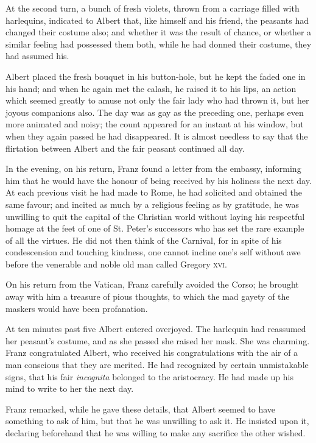  At the second turn, a bunch of fresh violets, thrown from a carriage filled with harlequins, indicated to Albert that, like himself and his friend, the peasants had changed their costume also; and whether it was the result of chance, or whether a similar feeling had possessed them both, while he had donned their costume, they had assumed his. 

 Albert placed the fresh bouquet in his button-hole, but he kept the faded one in his hand; and when he again met the calash, he raised it to his lips, an action which seemed greatly to amuse not only the fair lady who had thrown it, but her joyous companions also. The day was as gay as the preceding one, perhaps even more animated and noisy; the count appeared for an instant at his window, but when they again passed he had disappeared. It is almost needless to say that the flirtation between Albert and the fair peasant continued all day. 

 In the evening, on his return, Franz found a letter from the embassy, informing him that he would have the honour of being received by his holiness the next day. At each previous visit he had made to Rome, he had solicited and obtained the same favour; and incited as much by a religious feeling as by gratitude, he was unwilling to quit the capital of the Christian world without laying his respectful homage at the feet of one of St. Peter's successors who has set the rare example of all the virtues. He did not then think of the Carnival, for in spite of his condescension and touching kindness, one cannot incline one's self without awe before the venerable and noble old man called Gregory \textsc{xvi.} 

 On his return from the Vatican, Franz carefully avoided the Corso; he brought away with him a treasure of pious thoughts, to which the mad gayety of the maskers would have been profanation. 

 At ten minutes past five Albert entered overjoyed. The harlequin had reassumed her peasant's costume, and as she passed she raised her mask. She was charming. Franz congratulated Albert, who received his congratulations with the air of a man conscious that they are merited. He had recognized by certain unmistakable signs, that his fair \textit{incognita} belonged to the aristocracy. He had made up his mind to write to her the next day. 

 Franz remarked, while he gave these details, that Albert seemed to have something to ask of him, but that he was unwilling to ask it. He insisted upon it, declaring beforehand that he was willing to make any sacrifice the other wished. 


